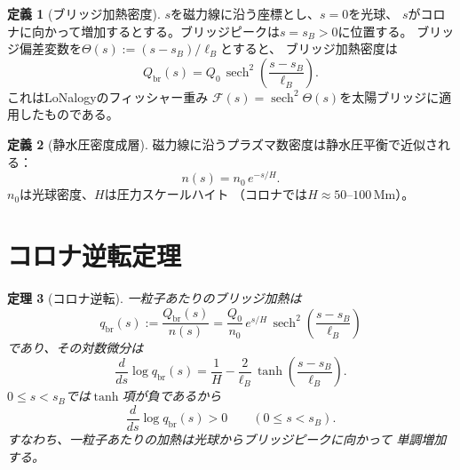 \documentclass[12pt]{article}
\theoremstyle{plain}
\newtheorem{theorem}{定理}[section]
\theoremstyle{definition}
\newtheorem{definition}[theorem]{定義}
\numberwithin{equation}{section}
\newcommand{\br}{\mathrm{br}}
\DeclareMathOperator{\sech}{sech}
\begin{document}
\begin{definition}[ブリッジ加熱密度]\label{def:heatingprofile}
$s$を磁力線に沿う座標とし、$s=0$を光球、
$s$がコロナに向かって増加するとする。ブリッジピークは$s=s_B>0$に位置する。
ブリッジ偏差変数を$\Theta(s) := (s-s_B)/\ell_B$とすると、
ブリッジ加熱密度は
\begin{equation}\label{eq:Qbr}
\boxed{Q_{\br}(s) = Q_0\,\sech^2\!\left(\frac{s-s_B}{\ell_B}\right).}
\end{equation}
これはLoNalogyのフィッシャー重み
$\mathcal{F}(s)=\sech^2\Theta(s)$を太陽ブリッジに適用したものである。
\end{definition}

\begin{definition}[静水圧密度成層]\label{def:density}
磁力線に沿うプラズマ数密度は静水圧平衡で近似される：
\begin{equation}\label{eq:density}
n(s) = n_0\,e^{-s/H}.
\end{equation}
$n_0$は光球密度、$H$は圧力スケールハイト
（コロナでは$H\approx 50$--$100\,\mathrm{Mm}$）。
\end{definition}


\section{コロナ逆転定理}\label{sec:inversion}

\begin{theorem}[コロナ逆転]\label{thm:inversion}
一粒子あたりのブリッジ加熱は
\begin{equation}\label{eq:perparticle}
q_{\br}(s) := \frac{Q_{\br}(s)}{n(s)}
= \frac{Q_0}{n_0}\,e^{s/H}\,
\sech^2\!\left(\frac{s-s_B}{\ell_B}\right)
\end{equation}
であり、その対数微分は
\begin{equation}\label{eq:logderiv}
\frac{d}{ds}\log q_{\br}(s)
= \frac{1}{H}
- \frac{2}{\ell_B}\,\tanh\!\left(\frac{s-s_B}{\ell_B}\right).
\end{equation}
$0\leq s<s_B$では$\tanh$項が負であるから
\begin{equation}\label{eq:monotone}
\boxed{\frac{d}{ds}\log q_{\br}(s) > 0
\qquad (0\leq s<s_B).}
\end{equation}
すなわち、一粒子あたりの加熱は光球からブリッジピークに向かって
単調増加する。
\end{theorem}
\end{document}
